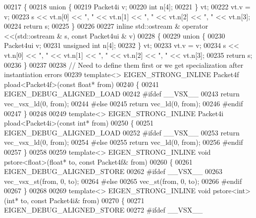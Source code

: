 \begin{DoxyCode}
{00217 \{
00218   \textcolor{keyword}{union }\{
00219     Packet4i   v;
00220     \textcolor{keywordtype}{int} n[4];
00221   \} vt;
00222   vt.v = v;
00223   s << vt.n[0] << \textcolor{stringliteral}{", "} << vt.n[1] << \textcolor{stringliteral}{", "} << vt.n[2] << \textcolor{stringliteral}{", "} << vt.n[3];
00224   \textcolor{keywordflow}{return} s;
00225 \}
00226 
00227 \textcolor{keyword}{inline} std::ostream & operator <<(std::ostream & s, \textcolor{keyword}{const} Packet4ui & v)
00228 \{
00229   \textcolor{keyword}{union }\{
00230     Packet4ui   v;
00231     \textcolor{keywordtype}{unsigned} \textcolor{keywordtype}{int} n[4];
00232   \} vt;
00233   vt.v = v;
00234   s << vt.n[0] << \textcolor{stringliteral}{", "} << vt.n[1] << \textcolor{stringliteral}{", "} << vt.n[2] << \textcolor{stringliteral}{", "} << vt.n[3];
00235   \textcolor{keywordflow}{return} s;
00236 \}
00237 
00238 \textcolor{comment}{// Need to define them first or we get specialization after instantiation errors}
00239 \textcolor{keyword}{template}<> EIGEN\_STRONG\_INLINE Packet4f pload<Packet4f>(\textcolor{keyword}{const} \textcolor{keywordtype}{float}* from)
00240 \{
00241   EIGEN\_DEBUG\_ALIGNED\_LOAD
00242 \textcolor{preprocessor}{#ifdef \_\_VSX\_\_}
00243   \textcolor{keywordflow}{return} vec\_vsx\_ld(0, from);
00244 \textcolor{preprocessor}{#else}
00245   \textcolor{keywordflow}{return} vec\_ld(0, from);
00246 \textcolor{preprocessor}{#endif}
00247 \}
00248 
00249 \textcolor{keyword}{template}<> EIGEN\_STRONG\_INLINE Packet4i pload<Packet4i>(\textcolor{keyword}{const} \textcolor{keywordtype}{int}*     from)
00250 \{
00251   EIGEN\_DEBUG\_ALIGNED\_LOAD
00252 \textcolor{preprocessor}{#ifdef \_\_VSX\_\_}
00253   \textcolor{keywordflow}{return} vec\_vsx\_ld(0, from);
00254 \textcolor{preprocessor}{#else}
00255   \textcolor{keywordflow}{return} vec\_ld(0, from);
00256 \textcolor{preprocessor}{#endif}
00257 \}
00258 
00259 \textcolor{keyword}{template}<> EIGEN\_STRONG\_INLINE \textcolor{keywordtype}{void} pstore<float>(\textcolor{keywordtype}{float}*   to, \textcolor{keyword}{const} Packet4f& from)
00260 \{
00261   EIGEN\_DEBUG\_ALIGNED\_STORE
00262 \textcolor{preprocessor}{#ifdef \_\_VSX\_\_}
00263   vec\_vsx\_st(from, 0, to);
00264 \textcolor{preprocessor}{#else}
00265   vec\_st(from, 0, to);
00266 \textcolor{preprocessor}{#endif}
00267 \}
00268 
00269 \textcolor{keyword}{template}<> EIGEN\_STRONG\_INLINE \textcolor{keywordtype}{void} pstore<int>(\textcolor{keywordtype}{int}*       to, \textcolor{keyword}{const} Packet4i& from)
00270 \{
00271   EIGEN\_DEBUG\_ALIGNED\_STORE
00272 \textcolor{preprocessor}{#ifdef \_\_VSX\_\_}
}
\end{DoxyCode}
